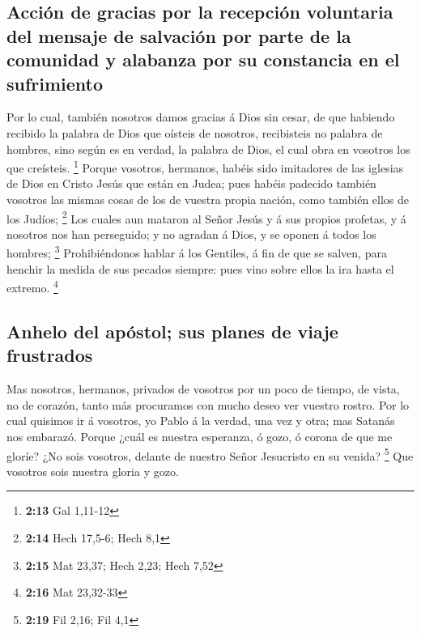 \hypertarget{acciuxf3n-de-gracias-por-la-recepciuxf3n-voluntaria-del-mensaje-de-salvaciuxf3n-por-parte-de-la-comunidad-y-alabanza-por-su-constancia-en-el-sufrimiento}{%
\subsection{Acción de gracias por la recepción voluntaria del mensaje de
salvación por parte de la comunidad y alabanza por su constancia en el
sufrimiento}\label{acciuxf3n-de-gracias-por-la-recepciuxf3n-voluntaria-del-mensaje-de-salvaciuxf3n-por-parte-de-la-comunidad-y-alabanza-por-su-constancia-en-el-sufrimiento}}

 Por lo cual, también nosotros damos gracias á Dios sin
cesar, de que habiendo recibido la palabra de Dios que oísteis de
nosotros, recibisteis no palabra de hombres, sino según es en verdad, la
palabra de Dios, el cual obra en vosotros los que creísteis. \footnote{\textbf{2:13}
  Gal 1,11-12}  Porque vosotros, hermanos, habéis sido
imitadores de las iglesias de Dios en Cristo Jesús que están en Judea;
pues habéis padecido también vosotros las mismas cosas de los de vuestra
propia nación, como también ellos de los Judíos; \footnote{\textbf{2:14}
  Hech 17,5-6; Hech 8,1}  Los cuales aun mataron al Señor
Jesús y á sus propios profetas, y á nosotros nos han perseguido; y no
agradan á Dios, y se oponen á todos los hombres; \footnote{\textbf{2:15}
  Mat 23,37; Hech 2,23; Hech 7,52}  Prohibiéndonos hablar
á los Gentiles, á fin de que se salven, para henchir la medida de sus
pecados siempre: pues vino sobre ellos la ira hasta el extremo.
\footnote{\textbf{2:16} Mat 23,32-33}

\hypertarget{anhelo-del-apuxf3stol-sus-planes-de-viaje-frustrados}{%
\subsection{Anhelo del apóstol; sus planes de viaje
frustrados}\label{anhelo-del-apuxf3stol-sus-planes-de-viaje-frustrados}}

 Mas nosotros, hermanos, privados de vosotros por un poco
de tiempo, de vista, no de corazón, tanto más procuramos con mucho deseo
ver vuestro rostro.  Por lo cual quisimos ir á vosotros,
yo Pablo á la verdad, una vez y otra; mas Satanás nos embarazó.
 Porque ¿cuál es nuestra esperanza, ó gozo, ó corona de
que me gloríe? ¿No sois vosotros, delante de nuestro Señor Jesucristo en
su venida? \footnote{\textbf{2:19} Fil 2,16; Fil 4,1} 
Que vosotros sois nuestra gloria y gozo.

